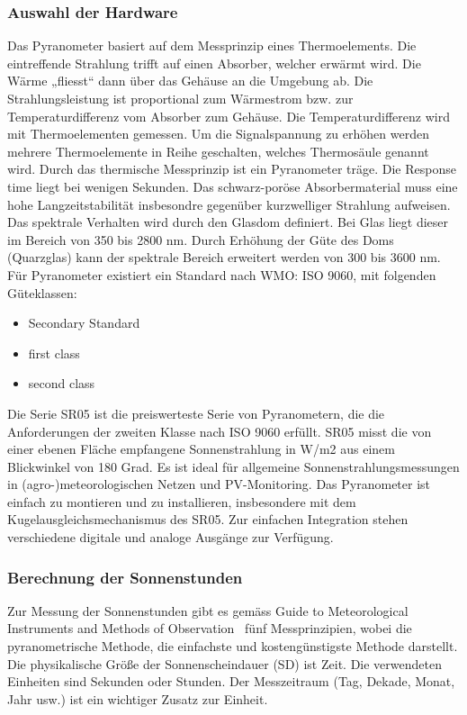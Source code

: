\subsubsection{Auswahl der Hardware}


Das Pyranometer basiert auf dem Messprinzip eines Thermoelements. Die eintreffende Strahlung trifft auf einen Absorber, welcher erwärmt wird. Die Wärme „fliesst“ dann über das Gehäuse an die Umgebung ab. Die Strahlungsleistung ist proportional zum Wärmestrom bzw. zur Temperaturdifferenz vom Absorber zum Gehäuse. Die Temperaturdifferenz wird mit Thermoelementen gemessen. Um die Signalspannung zu erhöhen werden mehrere Thermoelemente in Reihe geschalten, welches Thermosäule genannt wird. Durch das thermische Messprinzip ist ein Pyranometer träge. Die Response time liegt bei wenigen Sekunden. Das schwarz-poröse Absorbermaterial muss eine hohe Langzeitstabilität insbesondre gegenüber kurzwelliger Strahlung aufweisen. Das spektrale Verhalten wird durch den Glasdom definiert. Bei Glas liegt dieser im Bereich von 350 bis 2800 nm. Durch Erhöhung der Güte des Doms (Quarzglas) kann der spektrale Bereich erweitert werden von 300 bis 3600 nm. Für Pyranometer existiert ein Standard nach WMO: ISO 9060, mit folgenden Güteklassen:


\begin{itemize}
\item Secondary Standard
\item first class
\item second class
\end{itemize}


Die Serie SR05 ist die preiswerteste Serie von Pyranometern, die die Anforderungen der zweiten Klasse nach ISO 9060 erfüllt. SR05 misst die von einer ebenen Fläche empfangene Sonnenstrahlung in W/m2 aus einem Blickwinkel von 180 Grad. Es ist ideal für allgemeine Sonnenstrahlungsmessungen in (agro-)meteorologischen Netzen und PV-Monitoring. Das Pyranometer ist einfach zu montieren und zu installieren, insbesondere mit dem Kugelausgleichsmechanismus des SR05. Zur einfachen Integration stehen verschiedene digitale und analoge Ausgänge zur Verfügung.


\subsubsection{Berechnung der Sonnenstunden}
Zur Messung der Sonnenstunden gibt es gemäss  \flqq Guide to Meteorological Instruments and Methods of Observation\frqq ~\cite{WMO2014Gtmi}  fünf Messprinzipien, wobei die pyranometrische Methode, die einfachste und kostengünstigste Methode darstellt. Die physikalische Größe der Sonnenscheindauer (SD) ist Zeit. Die verwendeten Einheiten sind Sekunden oder Stunden.
Der Messzeitraum (Tag, Dekade, Monat, Jahr usw.) ist ein wichtiger Zusatz zur Einheit.


